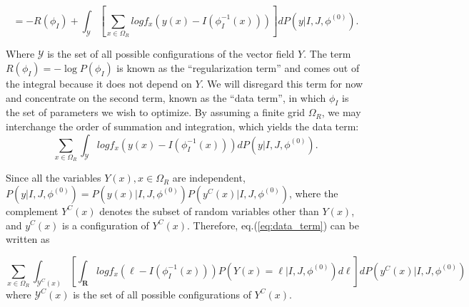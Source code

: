 \begin{equation}
    =-R(\phi_{I}) + \int_{\mathcal{Y}}\left[\sum_{x\in\Omega_{R}} log f_{x}\left(y(x) - I(\phi^{-1}_{I}(x))\right) \right] dP(y | I, J, \phi^{(0)}).
\end{equation}

Where $\mathcal{Y}$ is the set of all possible configurations of the vector field $Y$. The term $R(\phi_{I}) = -\log P(\phi_{I})$ is known as the ``regularization term'' and comes out of the
integral because it does not depend on $Y$. We will disregard this term for now and concentrate on the second term, known as the ``data term'', in which $\phi_{I}$ is the
set of parameters we wish to optimize. By assuming a finite grid $\Omega_{R}$, we may interchange the order of summation and integration, which yields the data term:
\begin{equation}\label{eq:data_term}
    \sum_{x\in\Omega_{R}} \int_{\mathcal{Y}} log f_{x}\left(y(x) - I(\phi^{-1}_{I}(x))\right)  dP(y | I, J, \phi^{(0)}).
\end{equation}

Since all the variables $Y(x), x\in\Omega_{R}$ are independent, $P(y | I, J, \phi^{(0)}) = P(y(x)| I, J, \phi^{(0)})P(y^{C}(x) | I, J, \phi^{(0)})$, where the complement $Y^{C}(x)$
denotes the subset of random variables other than $Y(x)$, and $y^{C}(x)$ is a configuration of $Y^{C}(x)$. Therefore, eq.(\ref{eq:data_term}) can be written as

\begin{equation}
    \sum_{x\in\Omega_{R}} \int_{\mathcal{Y}^{C}(x)} \left[\int_{\mathbf{R}} log f_{x}\left(\ell - I(\phi^{-1}_{I}(x))\right) P(Y(x) = \ell | I, J, \phi^{(0)})d\ell\right]  dP(y^{C}(x) | I, J, \phi^{(0)})
\end{equation}
where $\mathcal{Y}^{C}(x)$ is the set of all possible configurations of $Y^{C}(x)$.\\

